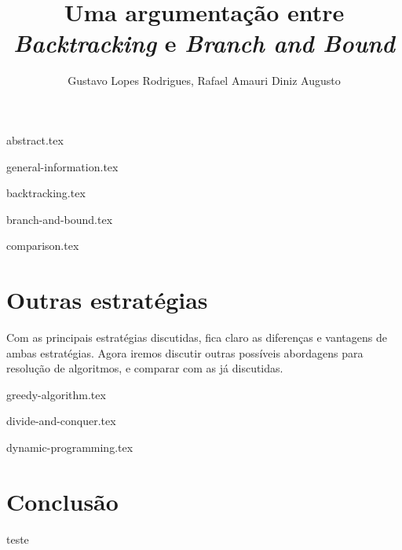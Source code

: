 \documentclass[12pt]{article}
\title{Uma argumentação entre \emph{Backtracking} e \emph{Branch and Bound}}
\author{Gustavo Lopes Rodrigues\inst{1}, Rafael Amauri Diniz Augusto\inst{2}}
\begin{document}
 

  \maketitle

  {abstract.tex}

  {general-information.tex}

  {backtracking.tex}

  {branch-and-bound.tex}

  {comparison.tex}

  \section{Outras estratégias} \label{sec:other-strategies}

    Com as principais estratégias discutidas, fica claro as diferenças 
    e vantagens de ambas estratégias. Agora iremos discutir outras possíveis
    abordagens para resolução de algoritmos, e comparar com as já discutidas.
    
    {greedy-algorithm.tex}

    {divide-and-conquer.tex}
  
    {dynamic-programming.tex}

  \section{Conclusão}

  teste 

  
  
\end{document}
